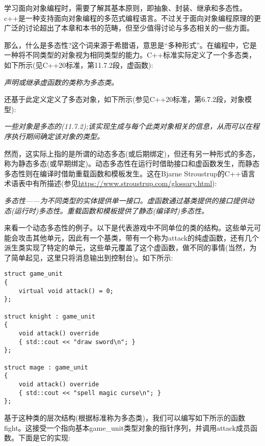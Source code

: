 学习面向对象编程时，需要了解其基本原则，即抽象、封装、继承和多态性。c++是一种支持面向对象编程的多范式编程语言。不过关于面向对象编程原理的更广泛的讨论超出了本章和本书的范畴，但至少值得讨论与多态相关的一些方面。

那么，什么是多态性?这个词来源于希腊语，意思是“多种形式”。在编程中，它是一种将不同类型的对象视为相同类型的能力。C++标准实际定义了一个多态类，如下所示(见C++20标准，第11.7.2段，虚函数):

\begin{center}
\textit{
声明或继承虚函数的类称为多态类。
}
\end{center}

还基于此定义定义了多态对象，如下所示(参见C++20标准，第6.7.2段，对象模型):

\begin{center}
\textit{
一些对象是多态的(11.7.2);该实现生成与每个此类对象相关的信息，从而可以在程序执行期间确定该对象的类型。
}
\end{center}

然而，这实际上指的是所谓的动态多态(或后期绑定)，但还有另一种形式的多态，称为静态多态(或早期绑定)。动态多态性在运行时借助接口和虚函数发生，而静态多态性则在编译时借助重载函数和模板发生。这在Bjarne Stroustrup的C++语言术语表中有所描述(参见\url{https://www.stroustrup.com/glossary.html}):

\begin{center}
\textit{
多态性——为不同类型的实体提供单一接口。虚函数通过基类提供的接口提供动态(运行时)多态性。重载函数和模板提供了静态(编译时)多态性。
}
\end{center}

来看一个动态多态性的例子。以下是代表游戏中不同单位的类的结构。这些单元可能会攻击其他单元，因此有一个基类，带有一个称为attack的纯虚函数，还有几个派生类实现了特定的单元，这些单元覆盖了这个虚函数，做不同的事情(当然，为了简单起见，这里只将消息输出到控制台)。如下所示:

\begin{lstlisting}[style=styleCXX]
struct game_unit
{
	virtual void attack() = 0;
};

struct knight : game_unit
{
	void attack() override
	{ std::cout << "draw sword\n"; }
};

struct mage : game_unit
{
	void attack() override
	{ std::cout << "spell magic curse\n"; }
};
\end{lstlisting}

基于这种类的层次结构(根据标准称为多态类)，我们可以编写如下所示的函数fight。这接受一个指向基本game\_unit类型对象的指针序列，并调用attack成员函数。下面是它的实现:

